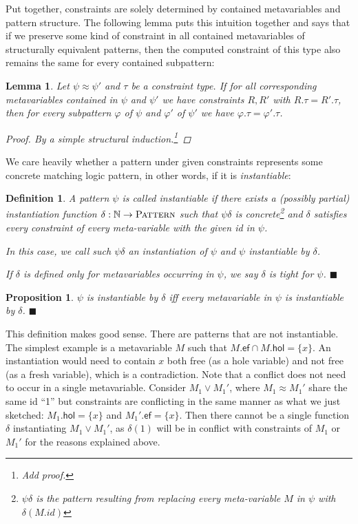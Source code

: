\documentclass{article}
\newcommand{\xqed}[1]{%
    \leavevmode\unskip\penalty9999 \hbox{}\nobreak\hfill
    \quad\hbox{\ensuremath{#1}}}
\newcommand{\xqedhere}{\xqed{\blacksquare}}
\newtheorem{deff}{Definition}
\newenvironment{definition}[1]{%
  \begin{deff}#1}{%
  \xqedhere\end{deff}%
}
\numberwithin{deff}{section}
\newtheorem{lemma*}{Lemma}
\numberwithin{lemma*}{section}
\newtheorem{proposition*}{Proposition}
\newenvironment{proposition}[1]{%
    \begin{proposition*}#1}{%
    \xqedhere\end{proposition*}%
  }
\newcommand{\Nat}{\mathbb{N}}
\newcommand{\Pat}{\textsc{Pattern}}
\newcommand{\s}[1]{\{ #1 \}}
\newcommand{\Ef}{\mathsf{ef}}
\newcommand{\Hol}{\mathsf{hol}}
\begin{document}
Put together, constraints are solely determined by contained metavariables and pattern structure.
The following lemma puts this intuition together and says that if we preserve some kind of constraint in all contained metavariables of structurally equivalent patterns, then the computed constraint of this type also remains the same for every contained subpattern:
\begin{lemma*}
  \label{lemma:constraints}
  Let $\psi \approx \psi'$ and $\tau$ be a constraint type.
  If for all corresponding metavariables contained in $\psi$ and $\psi'$  we have constraints $R, R'$ with $R.\tau = R'.\tau$, then for every subpattern $\varphi$ of $\psi$ and $\varphi'$ of $\psi'$  we have $\varphi.\tau = \varphi'.\tau$.
  \begin{proof}
    By a simple structural induction.\footnote{Add proof.}
  \end{proof}
\end{lemma*}

We care heavily whether a pattern under given constraints represents some concrete matching logic pattern, in other words, if it is \emph{instantiable}:
\begin{definition}
  \label{def:instant}
  A pattern $\psi$ is called \emph{instantiable} if there exists a (possibly partial) \emph{instantiation function} $\delta : \Nat \to \Pat$ such that $\psi \delta$ is concrete\footnote{$\psi\delta$ is the pattern resulting from replacing every meta-variable $M$ in $\psi$ with $\delta(M.id)$} and $\delta$ satisfies every constraint of every meta-variable with the given id in $\psi$.

  In this case, we call such $\psi \delta$ an \emph{instantiation} of $\psi$ and $\psi$ \emph{instantiable by} $\delta$.

  If $\delta$ is defined only for metavariables occurring in $\psi$, we say $\delta$ is \emph{tight} for $\psi$.
\end{definition}

\begin{proposition}
  \label{prop:inst_distro}
  $\psi$ is instantiable by $\delta$ iff every metavariable in $\psi$ is instantiable by $\delta$.
\end{proposition}

This definition makes good sense.
There are patterns that are not instantiable.
The simplest example is a metavariable $M$ such that $M.\Ef \cap M.\Hol = \s{x}$.
An instantiation would need to contain $x$ both free (as a hole variable) and not free (as a fresh variable), which is a contradiction.
Note that a conflict does not need to occur in a single metavariable.
Consider $M_1 \lor M_1'$, where $M_1 \approx M_1'$ share the same id ``1''  but constraints are conflicting in the same manner as what we just sketched: $M_1.\Hol = \s{x}$ and $M_1'.\Ef = \s{x}$.
Then there cannot be a single function $\delta$ instantiating $M_1 \lor M_1'$, as $\delta(1)$ will be in conflict with constraints of $M_1$ or $M_1'$ for the reasons explained above.
\end{document}
